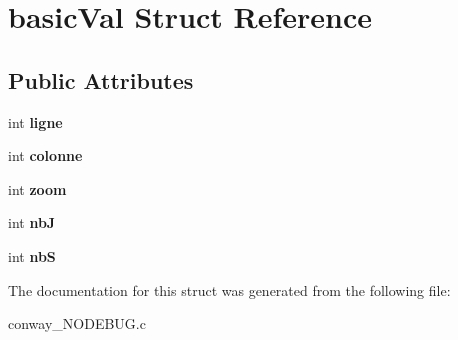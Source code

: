 \hypertarget{structbasicVal}{\section{basic\-Val Struct Reference}
\label{structbasicVal}
}
\subsection*{Public Attributes}
\begin{DoxyCompactItemize}
\item 
\hypertarget{structbasicVal_af754c5a55ecb3c4ad62509eb065006ad}{int {\bfseries ligne}}\label{structbasicVal_af754c5a55ecb3c4ad62509eb065006ad}

\item 
\hypertarget{structbasicVal_a2e30d503d7cfc0d9d0ba8f47a6a01007}{int {\bfseries colonne}}\label{structbasicVal_a2e30d503d7cfc0d9d0ba8f47a6a01007}

\item 
\hypertarget{structbasicVal_a2a20deb7a5ed5617ab29ac273036b700}{int {\bfseries zoom}}\label{structbasicVal_a2a20deb7a5ed5617ab29ac273036b700}

\item 
\hypertarget{structbasicVal_a3fae8b7416bb645428b2437cd214ce2d}{int {\bfseries nb\-J}}\label{structbasicVal_a3fae8b7416bb645428b2437cd214ce2d}

\item 
\hypertarget{structbasicVal_a409e926d52d06e88721f101ed91bc7a1}{int {\bfseries nb\-S}}\label{structbasicVal_a409e926d52d06e88721f101ed91bc7a1}

\end{DoxyCompactItemize}


The documentation for this struct was generated from the following file\-:\begin{DoxyCompactItemize}
\item 
conway\-\_\-\-N\-O\-D\-E\-B\-U\-G.\-c\end{DoxyCompactItemize}
